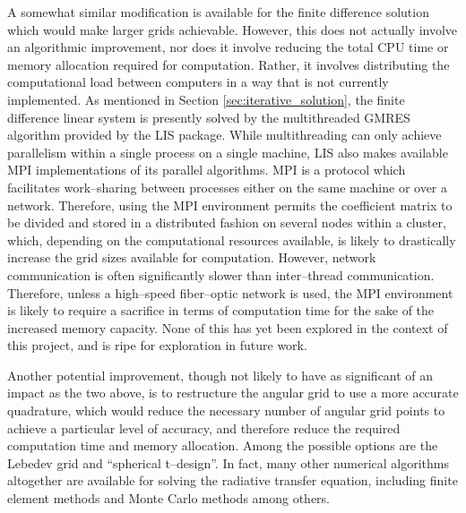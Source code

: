 A somewhat similar modification is available for the finite difference solution which would make larger grids achievable.
However, this does not actually involve an algorithmic improvement, nor does it involve reducing the total CPU time or memory allocation required for computation.
Rather, it involves distributing the computational load between computers in a way that is not currently implemented.
As mentioned in Section \ref{sec:iterative_solution}, the finite difference linear system is presently solved by the multithreaded GMRES algorithm provided by the LIS package.
While multithreading can only achieve parallelism within a single process on a single machine, LIS also makes available MPI implementations of its parallel algorithms.
MPI is a protocol which facilitates work--sharing between processes either on the same machine or over a network.
Therefore, using the MPI environment permits the coefficient matrix to be divided and stored in a distributed fashion on several nodes within a cluster, which, depending on the computational resources available, is likely to drastically increase the grid sizes available for computation.
However, network communication is often significantly slower than inter--thread communication.
Therefore, unless a high--speed fiber--optic network is used, the MPI environment is likely to require a sacrifice in terms of computation time for the sake of the increased memory capacity.
None of this has yet been explored in the context of this project, and is ripe for exploration in future work.

Another potential improvement, though not likely to have as significant of an impact as the two above, is to restructure the angular grid to use a more accurate quadrature, which would reduce the necessary number of angular grid points to achieve a particular level of accuracy, and therefore reduce the required computation time and memory allocation.
Among the possible options are the Lebedev grid and ``spherical t--design''\cite{an_numerical_2016,beckmann_local_2014,beentjes_quadrature_nodate}.
In fact, many other numerical algorithms altogether are available for solving the radiative transfer equation, including finite element methods and Monte Carlo methods among others. %

